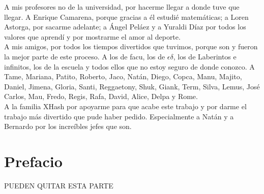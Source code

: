 \documentclass[11pt]{book}
\begin{document}
A mis profesores no de la universidad, por hacerme llegar a donde tuve que llegar. A Enrique Camarena, porque gracias a él estudié matemáticas; a Loren Astorga, por sacarme adelante; a Ángel Peláez y a Yuraldi Díaz por todos los valores que aprendí y por mostrarme el amor al deporte. \\
A mis amigos, por todos los tiempos divertidos que tuvimos, porque son y fueron la mejor parte de este proceso. A los de facu, los de $\epsilon \delta$, los de Laberintos e infinitos, los de la escuela y todos ellos que no estoy seguro de donde conozco. A Tame, Mariana, Patito, Roberto, Jaco, Natán, Diego, Copca, Manu, Majito, Daniel, Jimena, Gloria, Santi, Reggaetony, Shuk, Giank, Term, Silva, Lemus, José Carlos, Mau, Fredo, Regis, Rafa, David, Alice, Delpa y Rome. \\
A la familia XHash por apoyarme para que acabe este trabajo y por darme el trabajo más divertido que pude haber pedido. Especialmente a Natán y a Bernardo por los increíbles jefes que son.



\chapter*{Prefacio}

\pagestyle{plain}

PUEDEN QUITAR ESTA PARTE



\tableofcontents
\newpage


\mainmatter %
\pagestyle{headings}



\thispagestyle{empty}


\thispagestyle{empty}


\thispagestyle{empty}
\end{document}
